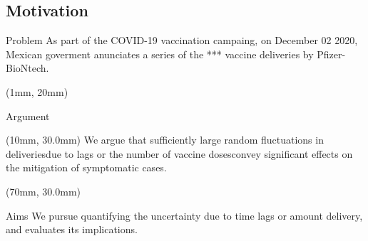\subsection{Motivation}
    \begin{frame}{Problem}
        As part of the COVID-19 vaccination campaing, on December 02
        2020, Mexican goverment anunciates a series of the ***
        vaccine deliveries by Pfizer-BioNtech.
        \begin{textblock*}{130mm}(1mm, 20mm)
    \end{textblock*}
    \end{frame}
%
\begin{frame}{Argument}
    \begin{textblock*}{50mm}(10mm, 30.0mm)
            We argue that sufficiently large random fluctuations in
        deliveries\textemdash due to lags or the number of vaccine
        doses\textemdash convey significant effects on the mitigation of
        symptomatic cases.
	\end{textblock*}

    \begin{textblock*}{50mm}(70mm, 30.0mm)
    \begin{block}{Aims}
        We pursue quantifying the uncertainty due to time lags or amount
        delivery, and evaluates its implications.
    \end{block}
    \end{textblock*}
\end{frame}
